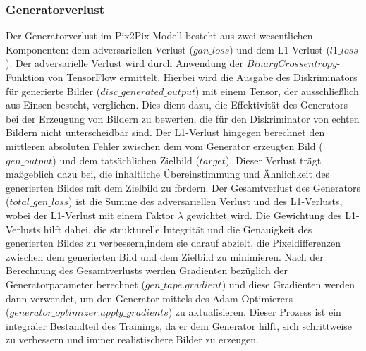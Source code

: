 \subsubsection{Generatorverlust}
Der Generatorverlust im Pix2Pix-Modell besteht aus zwei wesentlichen Komponenten: dem adversariellen Verlust ($gan\_loss$) und dem L1-Verlust ($l1\_loss$). Der adversarielle Verlust wird durch Anwendung der $BinaryCrossentropy$-Funktion von TensorFlow ermittelt. Hierbei wird die Ausgabe des Diskriminators für generierte Bilder ($disc\_generated\_output$) mit einem Tensor, der ausschließlich aus Einsen besteht, verglichen. Dies dient dazu, die Effektivität des Generators bei der Erzeugung von Bildern zu bewerten, die für den Diskriminator von echten Bildern nicht unterscheidbar sind. Der L1-Verlust hingegen berechnet den mittleren absoluten Fehler zwischen dem vom Generator erzeugten Bild ($gen\_output$) und dem tatsächlichen Zielbild ($target$). Dieser Verlust trägt maßgeblich dazu bei, die inhaltliche Übereinstimmung und Ähnlichkeit des generierten Bildes mit dem Zielbild zu fördern. \newline
Der Gesamtverlust des Generators ($total\_gen\_loss$) ist die Summe des adversariellen Verlust und des L1-Verlusts, wobei der L1-Verlust mit einem Faktor $\lambda$ gewichtet wird. Die Gewichtung des L1-Verlusts hilft dabei, die strukturelle Integrität und die Genauigkeit des generierten Bildes zu verbessern,indem sie darauf abzielt, die Pixeldifferenzen zwischen dem generierten Bild und dem Zielbild zu minimieren.\newline
Nach der Berechnung des Gesamtverlusts werden Gradienten bezüglich der Generatorparameter berechnet ($gen\_tape.gradient$) und diese Gradienten werden dann verwendet, um den Generator mittels des Adam-Optimierers \\($generator\_optimizer.apply\_gradients$) zu aktualisieren. Dieser Prozess ist ein integraler Bestandteil des Trainings, da er dem Generator hilft, sich schrittweise zu verbessern und immer realistischere Bilder zu erzeugen.

